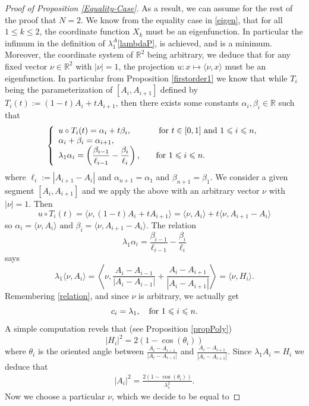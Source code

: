 \documentclass[12pt,english]{smfart} %
\theoremstyle{remark}
\newcommand{\R}{\mathbb{R}}
\begin{document}
\begin{proof}[Proof of Proposition \ref{Equality-Case}]
As a result, we can assume for the rest of the proof that $N=2$. We know from the equality case in \eqref{eigen}, that for all $1\leqslant k \leqslant 2$, the coordinate function $X_k$ must be an eigenfunction.  In particular the infimum in the definition of $\lambda_1^A$\eqref{lambdaP}, is achieved, and is a minimum.  Moreover, the coordinate system of $\R^2$ being arbitrary, we deduce that for any fixed  vector $\nu \in \R^2$ with $|\nu|=1$, the projection $u:x\mapsto \langle \nu, x \rangle$ must be an eigenfunction. In particular from Proposition \ref{firstorder1} we know that  while   $T_i$ being the parameterization of $[A_i,A_{i+1}]$ defined by $T_i(t) := (1-t)A_i + tA_{i+1}$, then there exists some constants $\alpha_i,\beta_i \in \R$ such that 
$$
\left\{
 \begin{array}{ll}
u\circ T_i(t)=\alpha_i +t \beta_i, \quad  &\textnormal{ for } t\in[0,1] \textnormal{ and }  1\leqslant i \leqslant n,\\
\alpha_i+\beta_i=\alpha_{i+1},\\\displaystyle 
\lambda_1\alpha_i=\left(\frac{\beta_{i-1}}{\ell_{i-1}} - \frac{\beta_i}{\ell_i}\right), \quad &\textnormal{for } 1\leqslant i  \leqslant n.
 \end{array}
  \right. 
 $$
 where $\ell_i:=|A_{i+1}-A_i|$ and $\alpha_{n+1}=\alpha_1$ and $\beta_{n+1}=\beta_1$.  We consider  a given segment $[A_{i},A_{i+1}]$   and we apply the above with an arbitrary vector $\nu$ with $|\nu|=1$. Then
$$u\circ{T_i(t)}=\langle  \nu , (1-t)A_i + tA_{i+1} \rangle =  \langle \nu , A_i \rangle + t\langle \nu , A_{i+1}-A_i \rangle$$
so $\alpha_i =  \langle \nu , A_i \rangle \text{ and } \beta_i=\langle \nu , A_{i+1}-A_i \rangle.$
The relation $$\lambda_1\alpha_i=\frac{\beta_{i-1}}{\ell_{i-1}} - \frac{\beta_i}{\ell_i}$$ says 
$$\lambda_1 \langle \nu , A_i \rangle= \left\langle \nu ,  \frac{A_{i}-A_{i-1}}{|A_{i}-A_{i-1}|} + \frac{A_i - A_{i+1}}{|A_{i}-A_{i+1}|} \right\rangle=\langle \nu , H_i\rangle.$$
Remembering \eqref{relation}, and since $\nu$ is arbitrary, we actually get 
$$c_i=\lambda_1, \quad \textnormal{for }1\leqslant i\leqslant n. $$
A simple computation revels that  (see Proposition \ref{propPoly})
$$|H_i|^2=2(1-\cos(\theta_i))$$
where $\theta_i$ is the oriented angle between $\frac{A_{i}-A_{i-1}}{|A_{i}-A_{i-1}|}$ and $\frac{A_i - A_{i+1}}{|A_{i}-A_{i+1}|}$.
Since $\lambda_1A_i=H_i$ we deduce that 
\begin{eqnarray}
|A_i|^2=\frac{2(1-\cos(\theta_i))}{\lambda_1^2}.\label{normrelation}
\end{eqnarray}
Now we choose a particular $\nu$, which we decide to be equal to 

\end{proof}
\end{document}
